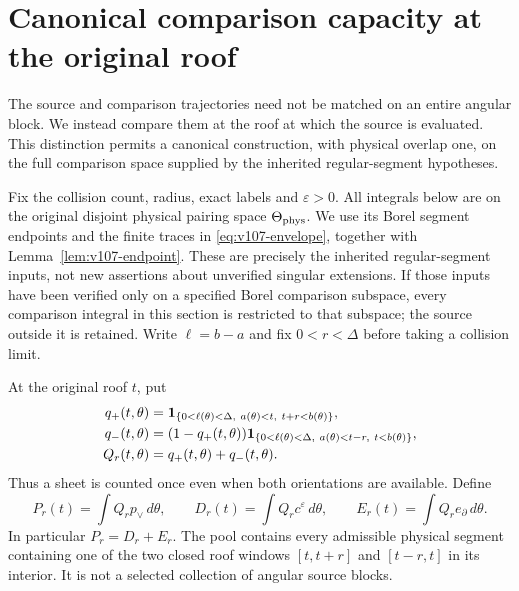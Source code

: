 \section{Canonical comparison capacity at the original roof}
\label{sec:v108-pool}
The source and comparison trajectories need not be matched on an
entire angular block. We instead compare them at the roof at which
the source is evaluated. This distinction permits a canonical
construction, with physical overlap one, on the full comparison
space supplied by the inherited regular-segment hypotheses.

Fix the collision count, radius, exact labels and $\varepsilon>0$.
All integrals below are on the original disjoint physical pairing
space $\Theta_{\rm phys}$. We use its Borel segment endpoints and
the finite traces in \eqref{eq:v107-envelope}, together with
Lemma~\ref{lem:v107-endpoint}. These are precisely the inherited
regular-segment inputs, not new assertions about unverified singular
extensions. If those inputs have been verified only on a specified
Borel comparison subspace, every comparison integral in this section
is restricted to that subspace; the source outside it is retained.
Write $\ell=b-a$ and fix $0<r<\Delta$ before taking a collision limit.

\begin{definition}\label{def:v108-pool}
At the original roof $t$, put
\begin{align}
 q_+(t,\theta)&=\mathbf1_{\{0<\ell(\theta)<\Delta,\ a(\theta)<t,
                                      \ t+r<b(\theta)\}},\notag\\
 q_-(t,\theta)&=(1-q_+(t,\theta))
        \mathbf1_{\{0<\ell(\theta)<\Delta,\ a(\theta)<t-r,
                                      \ t<b(\theta)\}},\notag\\
 Q_r(t,\theta)&=q_+(t,\theta)+q_-(t,\theta).
                                                    \label{eq:v108-pool}
\end{align}
Thus a sheet is counted once even when both orientations are
available. Define
\begin{equation}\label{eq:v108-PDE}
 P_r(t)=\int Q_r p_\vee\,d\theta,\qquad
 D_r(t)=\int Q_r c^\varepsilon\,d\theta,\qquad
 E_r(t)=\int Q_r e_\partial\,d\theta.
\end{equation}
In particular $P_r=D_r+E_r$. The pool contains every admissible
physical segment containing one of the two closed roof windows
$[t,t+r]$ and $[t-r,t]$ in its interior. It is not a selected
collection of angular source blocks.
\end{definition}

